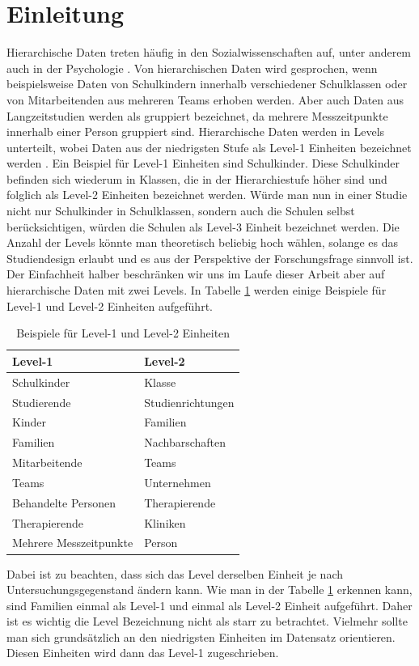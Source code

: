 \documentclass[12pt]{article}\usepackage[]{graphicx}\usepackage[]{color}
\begin{document}
\newpage

\section{Einleitung}
Hierarchische Daten treten häufig in den Sozialwissenschaften auf, unter anderem auch in der Psychologie \citep{SnijdersTomA.B2012Ma:a}. Von hierarchischen Daten wird gesprochen, wenn beispielsweise Daten von Schulkindern innerhalb verschiedener Schulklassen oder von Mitarbeitenden aus mehreren Teams erhoben werden. Aber auch Daten aus Langzeitstudien werden als gruppiert bezeichnet, da mehrere Messzeitpunkte innerhalb einer Person gruppiert sind. Hierarchische Daten werden in Levels unterteilt, wobei Daten aus der niedrigsten Stufe als Level-1 Einheiten bezeichnet werden \citep{SnijdersTomA.B2012Ma:a}. Ein Beispiel für Level-1 Einheiten sind Schulkinder. Diese Schulkinder befinden sich wiederum in Klassen, die in der Hierarchiestufe höher sind und folglich als Level-2 Einheiten bezeichnet werden. Würde man nun in einer Studie nicht nur Schulkinder in Schulklassen, sondern auch  die Schulen selbst berücksichtigen, würden die Schulen als Level-3 Einheit bezeichnet werden. Die Anzahl der Levels könnte man theoretisch beliebig hoch wählen, solange es das Studiendesign erlaubt und es aus der Perspektive der Forschungsfrage sinnvoll ist. Der Einfachheit halber beschränken wir uns im Laufe dieser Arbeit aber auf hierarchische Daten mit zwei Levels. In Tabelle \ref{tab:beispiele_levels} werden einige Beispiele für Level-1 und Level-2 Einheiten aufgeführt. 
\begin{table}[b!]
\centering
\begin{threeparttable}
\caption{Beispiele für Level-1 und Level-2 Einheiten}
\begin{tabular}{ll}
\toprule
Level-1 				& Level-2 	\\
\midrule
Schulkinder 			& Klasse 	\\
Studierende 			& Studienrichtungen \\
Kinder 					& Familien 	\\
Familien 				& Nachbarschaften \\
Mitarbeitende			& Teams \\
Teams					& Unternehmen \\
Behandelte Personen	 	& Therapierende \\
Therapierende 			& Kliniken \\
Mehrere Messzeitpunkte 	& Person \\
\bottomrule
\end{tabular}
\label{tab:beispiele_levels}
\end{threeparttable}
\end{table}
Dabei ist zu beachten, dass sich das Level derselben Einheit je nach Untersuchungsgegenstand ändern kann. Wie man in der Tabelle \ref{tab:beispiele_levels} erkennen kann, sind Familien einmal als Level-1 und einmal als Level-2 Einheit aufgeführt. Daher ist es wichtig die Level Bezeichnung nicht als starr zu betrachtet. Vielmehr sollte man sich grundsätzlich an den niedrigsten Einheiten im Datensatz orientieren. Diesen Einheiten wird dann das Level-1 zugeschrieben.
\end{document}
